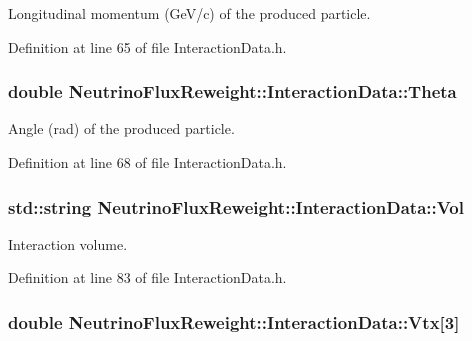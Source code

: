 Longitudinal momentum (Ge\-V/c) of the produced particle. 



Definition at line 65 of file Interaction\-Data.\-h.

\hypertarget{class_neutrino_flux_reweight_1_1_interaction_data_a7b4a6f012f27fdda0c6521fdb033e863}{
\subsubsection[{Theta}]{\setlength{\rightskip}{0pt plus 5cm}double Neutrino\-Flux\-Reweight\-::\-Interaction\-Data\-::\-Theta}}\label{class_neutrino_flux_reweight_1_1_interaction_data_a7b4a6f012f27fdda0c6521fdb033e863}


Angle (rad) of the produced particle. 



Definition at line 68 of file Interaction\-Data.\-h.

\hypertarget{class_neutrino_flux_reweight_1_1_interaction_data_afef1f2f1c9a0f59d076286f8fbc9083e}{
\subsubsection[{Vol}]{\setlength{\rightskip}{0pt plus 5cm}std\-::string Neutrino\-Flux\-Reweight\-::\-Interaction\-Data\-::\-Vol}}\label{class_neutrino_flux_reweight_1_1_interaction_data_afef1f2f1c9a0f59d076286f8fbc9083e}


Interaction volume. 



Definition at line 83 of file Interaction\-Data.\-h.

\hypertarget{class_neutrino_flux_reweight_1_1_interaction_data_a682fc7155e7fabd38431d6aff21ebdd1}{
\subsubsection[{Vtx}]{\setlength{\rightskip}{0pt plus 5cm}double Neutrino\-Flux\-Reweight\-::\-Interaction\-Data\-::\-Vtx\mbox{[}3\mbox{]}}}\label{class_neutrino_flux_reweight_1_1_interaction_data_a682fc7155e7fabd38431d6aff21ebdd1}



